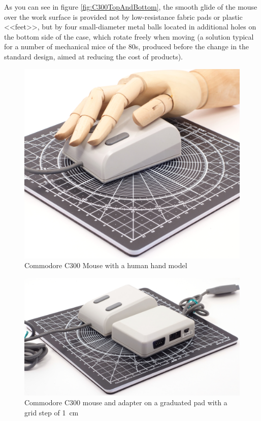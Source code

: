 \documentclass[11pt, a4paper]{article}
\begin{document}
As you can see in figure \ref{fig:C300TopAndBottom}, the smooth glide of the mouse over the work surface is provided not by low-resistance fabric pads or plastic <<feet>>, but by four small-diameter metal balls located in additional holes on the bottom side of the case, which rotate freely when moving (a solution typical for a number of mechanical mice of the 80s, produced before the change in the standard design, aimed at reducing the cost of products).

\begin{figure}[h]
    \centering
    \includegraphics[scale=0.3]{1986_commodore_c300_mouse/cmruka_30.jpg}
    \caption{Commodore C300 Mouse with a human hand model}
    \label{fig:C300Hand}
\end{figure}

\begin{figure}[h]
    \centering
    \includegraphics[scale=0.3]{1986_commodore_c300_mouse/cmblock_30.jpg}
    \caption{Commodore C300 mouse and adapter on a graduated pad with a grid step of 1~cm}
    \label{fig:C300Block}
\end{figure}
\end{document}
